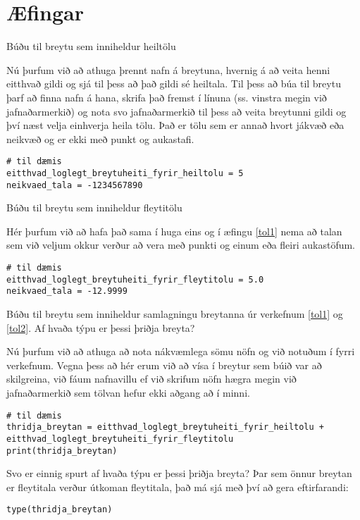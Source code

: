 \section{Æfingar}
\begin{exercise}\label{tol1}
		Búðu til breytu sem inniheldur heiltölu
	\end{exercise}
	\begin{Answer}[ref={tol1}]
		Nú þurfum við að athuga þrennt nafn á breytuna, hvernig á að veita henni eitthvað gildi og sjá til þess að það gildi sé heiltala.
		Til þess að búa til breytu þarf að finna nafn á hana, skrifa það fremst í línuna (ss. vinstra megin við jafnaðarmerkið) og nota svo jafnaðarmerkið til þess að veita breytunni gildi og því næst velja einhverja heila tölu.
		Það er tölu sem er annað hvort jákvæð eða neikvæð og er ekki með punkt og aukastafi.
\begin{lstlisting}
# til dæmis
eitthvad_loglegt_breytuheiti_fyrir_heiltolu = 5
neikvaed_tala = -1234567890\end{lstlisting}
\end{Answer}

\begin{exercise}\label{tol2}
	Búðu til breytu sem inniheldur fleytitölu
\end{exercise}
\begin{Answer}[ref={tol2}]
	Hér þurfum við að hafa það sama í huga eins og í æfingu \ref{tol1} nema að talan sem við veljum okkur verður að vera með punkti og einum eða fleiri aukastöfum.
\begin{lstlisting}
# til dæmis
eitthvad_loglegt_breytuheiti_fyrir_fleytitolu = 5.0
neikvaed_tala = -12.9999\end{lstlisting}
\end{Answer}

\begin{exercise}\label{tol2-5}
	Búðu til breytu sem inniheldur samlagningu breytanna úr verkefnum \ref{tol1} og \ref{tol2}. Af hvaða týpu er þessi þriðja breyta?
\end{exercise}
\begin{Answer}[ref={tol2-5}]
	Nú þurfum við að athuga að nota nákvæmlega sömu nöfn og við notuðum í fyrri verkefnum.
	Vegna þess að hér erum við að vísa í breytur sem búið var að skilgreina, við fáum nafnavillu ef við skrifum nöfn hægra megin við jafnaðarmerkið sem tölvan hefur ekki aðgang að í minni.
\begin{lstlisting}
# til dæmis
thridja_breytan = eitthvad_loglegt_breytuheiti_fyrir_heiltolu + eitthvad_loglegt_breytuheiti_fyrir_fleytitolu
print(thridja_breytan)\end{lstlisting}
	Svo er einnig spurt af hvaða týpu er þessi þriðja breyta?
	Þar sem önnur breytan er fleytitala verður útkoman fleytitala, það má sjá með því að gera eftirfarandi:
	
\begin{lstlisting}
type(thridja_breytan)\end{lstlisting}
\end{Answer}


